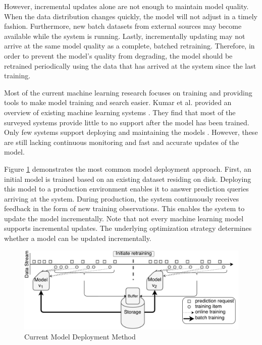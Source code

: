 \documentclass{vldb}
\begin{document}
However, incremental updates alone are not enough to maintain model quality. 
When the data distribution changes quickly, the model will not adjust in a timely fashion. 
Furthermore, new batch datasets from external sources may become available while the system is running.
Lastly, incrementally updating may not arrive at the same model quality as a complete, batched retraining.
Therefore, in order to prevent the model's quality from degrading, the model should be retrained periodically using the data that has arrived at the system since the last training.

Most of the current machine learning research focuses on training and providing tools to make model training and search easier. 
Kumar et al. provided an overview of existing machine learning systems \cite{kumar2015survey}. 
They find that most of the surveyed systems provide little to no support after the model has been trained.
Only few systems support deploying and maintaining the models \cite{akdere2011case, crankshaw2014missing}.
However, these are still lacking continuous monitoring and fast and accurate updates of the model.

Figure \ref{fig:velox-work-flow} demonstrates the most common model deployment approach.
First, an initial model is trained based on an existing dataset residing on disk.
Deploying this model to a production environment enables it to answer prediction queries arriving at the system.
During production, the system continuously receives feedback in the form of new training observations.
This enables the system to update the model incrementally.
Note that not every machine learning model supports incremental updates.
The underlying optimization strategy determines whether a model can be updated incrementally.
\begin{figure}[t]
\centering
\includegraphics[width=1\columnwidth]{../images/velox-final.pdf}
\caption{Current Model Deployment Method}
\label{fig:velox-work-flow}
\end{figure}
\end{document}
